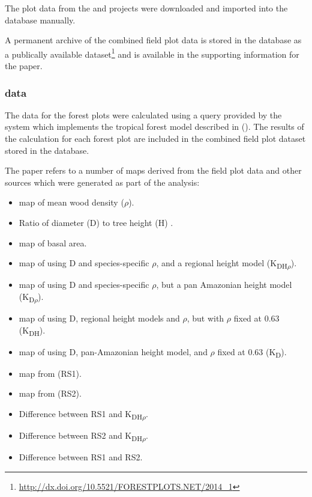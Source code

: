 \documentclass{article}
\begin{document}
The plot data from the \cite{team} and \cite{ppbio} projects were downloaded
and imported into the \cite{forest-plots} database manually.

A permanent archive of the combined field plot data is stored
in the \cite{forest-plots} database as a publically available
dataset\footnote{\url{http://dx.doi.org/10.5521/FORESTPLOTS.NET/2014_1}}
and is available in the supporting information for the paper.

\subsubsection{\cite{term-agb} data}

The \cite{term-agb} data for the forest plots were calculated using a
\cite{comp-lang-sql} query provided by the \cite{forest-plots} system which
implements the tropical forest model described in 
(\cite{chave-2005}).
The results of the \cite{term-agb} calculation for each forest plot are
included in the combined field plot dataset stored in the \cite{forest-plots}
database.

The paper refers to a number of maps derived from the field plot data and
other sources which were generated as part of the analysis:

\begin{itemize}
    \item \cite{kriged} map of mean wood density ($\rho$).
    \item Ratio of diameter (D) to tree height (H) \cite{feldpausch-2012}.
    \item \cite{kriged} map of basal area.
    \item \cite{kriged} map of \cite{term-agb} using D and species-specific
    $\rho$, and a regional height model (K\textsubscript{DH$\rho$}).
    \item \cite{kriged} map of \cite{term-agb} using D and species-specific
    $\rho$, but a pan Amazonian height model (K\textsubscript{D$\rho$}).
    \item \cite{kriged} map of \cite{term-agb} using D, regional height
    models and $\rho$, but with $\rho$ fixed at 0.63 (K\textsubscript{DH}).
    \item \cite{kriged} map of \cite{term-agb} using D, pan-Amazonian height
    model, and $\rho$ fixed at 0.63 (K\textsubscript{D}).
\end{itemize}

\begin{itemize}
    \item \cite{term-agb} map from \cite{saatchi-2011} (RS1).
    \item \cite{term-agb} map from \cite{baccini-2012} (RS2).
    \item Difference between RS1 and K\textsubscript{DH$\rho$}.
    \item Difference between RS2 and K\textsubscript{DH$\rho$}.
    \item Difference between RS1 and RS2.
\end{itemize}
\end{document}
